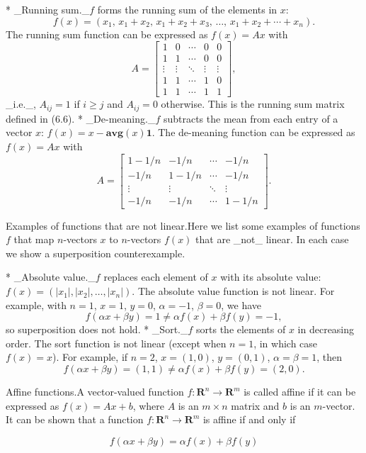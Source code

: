 * _Running sum._\(f\) forms the running sum of the elements in \(x\): \[f(x)=(x_{1},\,x_{1}+x_{2},\,x_{1}+x_{2}+x_{3},\,\ldots,\,x_{1}+x_{2}+\cdots+x_{n}).\] The running sum function can be expressed as \(f(x)=Ax\) with \[A=\left[\begin{array}{cccc}1&0&\cdots&0&0\\ 1&1&\cdots&0&0\\ \vdots&\vdots&\ddots&\vdots&\vdots\\ 1&1&\cdots&1&0\\ 1&1&\cdots&1&1\end{array}\right],\] _i.e._, \(A_{ij}=1\) if \(i\geq j\) and \(A_{ij}=0\) otherwise. This is the running sum matrix defined in (6.6).
* _De-meaning._\(f\) subtracts the mean from each entry of a vector \(x\): \(f(x)=x-\mathbf{avg}(x)\mathbf{1}\). The de-meaning function can be expressed as \(f(x)=Ax\) with \[A=\left[\begin{array}{cccc}1-1/n&-1/n&\cdots&-1/n\\ -1/n&1-1/n&\cdots&-1/n\\ \vdots&\vdots&\ddots&\vdots\\ -1/n&-1/n&\cdots&1-1/n\end{array}\right].\]

Examples of functions that are not linear.Here we list some examples of functions \(f\) that map \(n\)-vectors \(x\) to \(n\)-vectors \(f(x)\) that are _not_ linear. In each case we show a superposition counterexample.

* _Absolute value._\(f\) replaces each element of \(x\) with its absolute value: \(f(x)=(|x_{1}|,|x_{2}|,\ldots,|x_{n}|)\). The absolute value function is not linear. For example, with \(n=1\), \(x=1\), \(y=0\), \(\alpha=-1\), \(\beta=0\), we have \[f(\alpha x+\beta y)=1\neq\alpha f(x)+\beta f(y)=-1,\] so superposition does not hold.
* _Sort._\(f\) sorts the elements of \(x\) in decreasing order. The sort function is not linear (except when \(n=1\), in which case \(f(x)=x\)). For example, if \(n=2\), \(x=(1,0)\), \(y=(0,1)\), \(\alpha=\beta=1\), then \[f(\alpha x+\beta y)=(1,1)\neq\alpha f(x)+\beta f(y)=(2,0).\]

Affine functions.A vector-valued function \(f:\mathbf{R}^{n}\rightarrow\mathbf{R}^{m}\) is called affine if it can be expressed as \(f(x)=Ax+b\), where \(A\) is an \(m\times n\) matrix and \(b\) is an \(m\)-vector. It can be shown that a function \(f:\mathbf{R}^{n}\rightarrow\mathbf{R}^{m}\) is affine if and only if

\[f(\alpha x+\beta y)=\alpha f(x)+\beta f(y)\] 